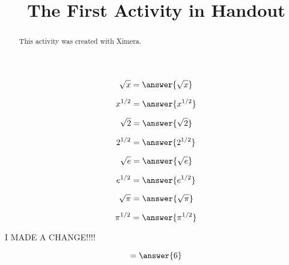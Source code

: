 \documentclass[handout]{ximera}
\title{The First Activity in Handout}
\begin{document}
  
\begin{abstract}  
This activity was created with Ximera.
\end{abstract}  
\maketitle

\begin{example}

\[
\sqrt{x} = \answer{\sqrt{x}}
\]

\[
x^{1/2} = \answer{x^{1/2}}
\]

\[
\sqrt{2} = \answer{\sqrt{2}}
\]

\[
2^{1/2} = \answer{2^{1/2}}
\] 

\[
\sqrt{e} = \answer{\sqrt{e}}
\]


\[
e^{1/2} = \answer{e^{1/2}}
\] 




\[
\sqrt{\pi} = \answer{\sqrt{\pi}}
\]


\[
\pi^{1/2} = \answer{\pi^{1/2}}
\] 
\end{example}
I MADE A CHANGE!!!!


\begin{problem}  
  \begin{prompt}
    \[
    = \answer{6}
    \]
  \end{prompt}
\end{problem}
\end{document}
